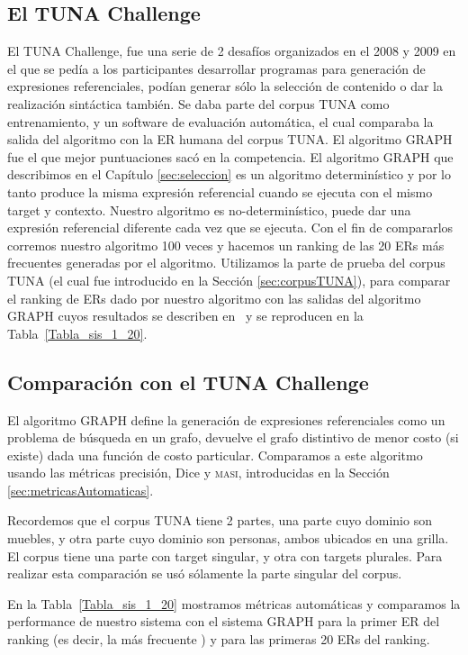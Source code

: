 \subsection{El TUNA Challenge}
El TUNA Challenge, fue una serie de 2 desaf\'ios organizados en el 2008 y 2009 en el que se ped\'ia a los participantes desarrollar programas para generaci\'on de expresiones referenciales, pod\'ian generar s\'olo la selecci\'on de contenido o dar la realizaci\'on sint\'actica tambi\'en.
Se daba parte del corpus TUNA como entrenamiento, y un software de evaluaci\'on autom\'atica, el cual comparaba la salida del algoritmo con la ER humana del corpus TUNA. El algoritmo GRAPH fue el que mejor puntuaciones sac\'o en la competencia.
El algoritmo GRAPH que describimos en el Cap\'itulo \ref{sec:seleccion} es un algoritmo determin\'istico y por lo tanto produce la misma expresi\'on referencial cuando se ejecuta con el mismo target y contexto. Nuestro algoritmo es no-determin\'istico, puede dar una expresi\'on referencial diferente cada vez que se ejecuta. Con el fin de compararlos corremos nuestro algoritmo 100 veces y hacemos un ranking de las 20 ERs m\'as frecuentes generadas por el algoritmo. Utilizamos la parte de prueba del corpus TUNA (el cual fue introducido en la Secci\'on \ref{sec:corpusTUNA}), para comparar el ranking de ERs dado por nuestro algoritmo con las salidas del algoritmo GRAPH cuyos resultados se describen en~\cite{KrahmerGRAPH} y se reproducen en la Tabla~\ref{Tabla_sis_1_20}.


\subsection{Comparaci\'on con el TUNA Challenge}
El algoritmo GRAPH define la generaci\'on de expresiones referenciales como un problema de b\'usqueda en un grafo, devuelve el grafo distintivo de menor costo (si existe) dada una funci\'on de costo particular. Comparamos a este algoritmo usando las m\'etricas precisi\'on, Dice y \textsc {masi}, introducidas en la Secci\'on \ref{sec:metricasAutomaticas}. 

Recordemos que el corpus TUNA tiene 2 partes, una parte cuyo dominio son muebles, y otra parte cuyo dominio son personas, ambos ubicados en una grilla. El corpus tiene una parte con target singular, y otra con targets plurales. Para realizar esta comparaci\'on se us\'o s\'olamente la parte singular del corpus.

En la Tabla~\ref{Tabla_sis_1_20} mostramos m\'etricas autom\'aticas y comparamos la performance de nuestro sistema con el sistema GRAPH para la primer ER del ranking (es decir, la m\'as frecuente ) y para las primeras 20 ERs del ranking.

